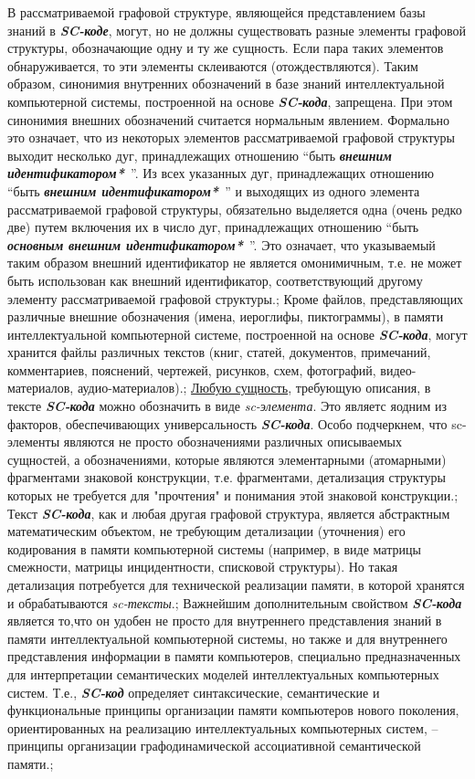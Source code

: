 \begin{SCn}
{В рассматриваемой графовой структуре, являющейся представлением базы знаний в \textit{\textbf{SC-коде}}, могут, но не должны существовать разные элементы графовой структуры, обозначающие одну и ту же сущность. Если пара таких элементов обнаруживается, то эти элементы склеиваются (отождествляются). Таким образом, синонимия внутренних обозначений в базе знаний интеллектуальной компьютерной системы, построенной на основе \textit{\textbf{SC-кода}}, запрещена. При этом синонимия внешних обозначений считается нормальным явлением. Формально это означает, что из некоторых элементов рассматриваемой графовой структуры выходит несколько дуг, принадлежащих отношению ``быть \textit{\textbf{внешним идентификатором*}}~''. Из всех указанных дуг, принадлежащих отношению ``быть \textit{\textbf{внешним идентификатором*}}~'' и выходящих из одного элемента рассматриваемой графовой структуры, обязательно выделяется одна (очень редко две) путем включения их в число дуг, принадлежащих отношению ``быть \textit{\textbf{основным внешним идентификатором*}}~''. Это означает, что указываемый таким образом внешний идентификатор не является омонимичным, т.е. не может быть использован как внешний идентификатор, соответствующий другому элементу рассматриваемой графовой структуры.;
Кроме файлов, представляющих различные внешние обозначения (имена, иероглифы, пиктограммы), в памяти интеллектуальной компьютерной системе, построенной на основе \textit{\textbf{SC-кода}}, могут хранится файлы различных текстов (книг, статей, документов, примечаний, комментариев, пояснений, чертежей, рисунков, схем, фотографий, видео-материалов, аудио-материалов).;
\uline{Любую сущность}, требующую описания, в тексте \textit{\textbf{SC-кода}} можно обозначить в виде \textit{sc-элемента}. Это являетс яодним из факторов, обеспечивающих универсальность \textit{\textbf{SC-кода}}. Особо подчеркнем, что sc-элементы являются не просто обозначениями различных описываемых сущностей, а обозначениями, которые являются элементарными (атомарными) фрагментами знаковой конструкции, т.е. фрагментами, детализация структуры которых не требуется для "прочтения"{} и понимания этой знаковой конструкции.;
Текст \textit{\textbf{SC-кода}}, как и любая другая графовой структура, является абстрактным математическим объектом, не требующим детализации (уточнения) его кодирования в памяти компьютерной системы (например, в виде матрицы смежности, матрицы инцидентности, списковой структуры). Но такая детализация потребуется для технической реализации памяти, в которой хранятся и обрабатываются \textit{sc-тексты}.;
Важнейшим дополнительным свойством \textit{\textbf{SC-кода}} является то,что он удобен не просто для внутреннего представления знаний в памяти интеллектуальной компьютерной системы, но также и для внутреннего представления информации в памяти компьютеров, специально предназначенных для интерпретации семантических моделей интеллектуальных компьютерных систем. Т.е., \textit{\textbf{SC-код}} определяет синтаксические, семантические и функциональные принципы организации памяти компьютеров нового поколения, ориентированных на реализацию интеллектуальных компьютерных систем, -- принципы организации графодинамической ассоциативной семантической памяти.;
}
\end{SCn}
